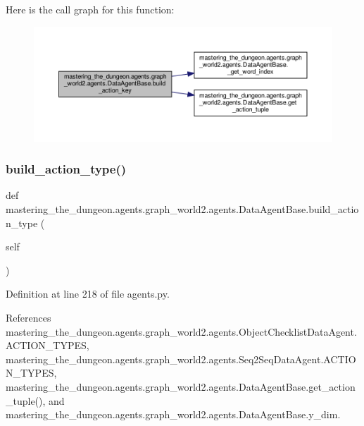 Here is the call graph for this function\+:
\nopagebreak
\begin{figure}[H]
\begin{center}
\leavevmode
\includegraphics[width=350pt]{classmastering__the__dungeon_1_1agents_1_1graph__world2_1_1agents_1_1DataAgentBase_a1f73b4d45203915df4938899046ff0eb_cgraph}
\end{center}
\end{figure}
\mbox{\label{classmastering__the__dungeon_1_1agents_1_1graph__world2_1_1agents_1_1DataAgentBase_a45e963a17f2639a29f35f66e858bcb86}} 
\subsubsection{\texorpdfstring{build\+\_\+action\+\_\+type()}{build\_action\_type()}}
{\footnotesize\ttfamily def mastering\+\_\+the\+\_\+dungeon.\+agents.\+graph\+\_\+world2.\+agents.\+Data\+Agent\+Base.\+build\+\_\+action\+\_\+type (\begin{DoxyParamCaption}\item[{}]{self }\end{DoxyParamCaption})}



Definition at line 218 of file agents.\+py.



References mastering\+\_\+the\+\_\+dungeon.\+agents.\+graph\+\_\+world2.\+agents.\+Object\+Checklist\+Data\+Agent.\+A\+C\+T\+I\+O\+N\+\_\+\+T\+Y\+P\+ES, mastering\+\_\+the\+\_\+dungeon.\+agents.\+graph\+\_\+world2.\+agents.\+Seq2\+Seq\+Data\+Agent.\+A\+C\+T\+I\+O\+N\+\_\+\+T\+Y\+P\+ES, mastering\+\_\+the\+\_\+dungeon.\+agents.\+graph\+\_\+world2.\+agents.\+Data\+Agent\+Base.\+get\+\_\+action\+\_\+tuple(), and mastering\+\_\+the\+\_\+dungeon.\+agents.\+graph\+\_\+world2.\+agents.\+Data\+Agent\+Base.\+y\+\_\+dim.

